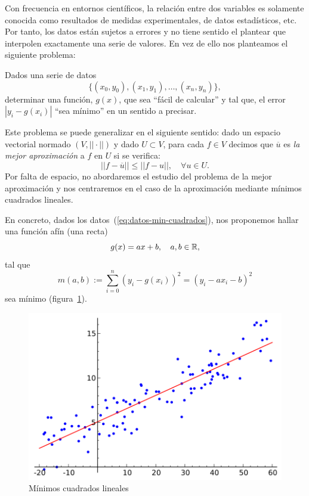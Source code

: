 Con frecuencia en entornos científicos, la relación entre dos
variables es solamente conocida como resultados de medidas
experimentales, de datos estadísticos, etc. Por tanto, los datos están
sujetos a errores y no tiene sentido el plantear que interpolen
exactamente una serie de valores. En vez de ello nos planteamos el
siguiente problema:

Dados una serie de datos 
\begin{equation}
\{(x_0,y_0),(x_1,y_1),\dots,(x_n,y_n)\}, 
\label{eq:datos-min-cuadrados}
\end{equation}
determinar una función, $g(x)$, que sea ``fácil de calcular'' y tal
que, el error $|y_i-g(x_i)|$ ``sea mínimo'' en un sentido a precisar.

Este problema se puede generalizar en el siguiente sentido: dado un espacio
vectorial normado $(V,||\cdot||)$ y dado $U\subset V$, para cada $f\in
V$ decimos que $\overline u$ es \textit{la mejor aproximación} a $f$
en $U$ si se verifica:
\begin{equation*}
  ||f-\overline u|| \le ||f-u||, \quad \forall u\in U.
\end{equation*}
Por falta de espacio, no abordaremos el estudio del problema de la
mejor aproximación y nos centraremos en el caso de la 
aproximación mediante mínimos cuadrados lineales.

En concreto, dados los datos~(\ref{eq:datos-min-cuadrados}), nos
proponemos hallar una función afín (una recta)
\begin{equation}
g(x)=ax+b, \quad a,b\in\operatorname{{\mathbb R}},\label{eq:5}
\end{equation}
tal que
\begin{equation*}
  m(a,b) := \sum_{i=0}^n
  \left(
    y_i - g(x_i)
  \right)^2
  =
  \left(
    y_i - a x_i - b
  \right)^2
\end{equation*}
sea mínimo (figura~\ref{fig:min-cuadrados-lineales}).

\begin{figure}
  \centering
  \includegraphics[width=0.6\linewidth]{tema2/linear_regression}
  \caption{Mínimos cuadrados lineales}
  \label{fig:min-cuadrados-lineales}
\end{figure}


